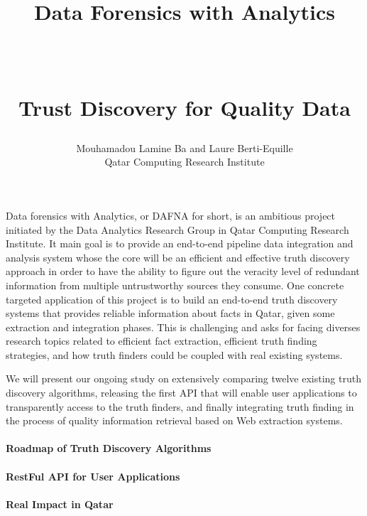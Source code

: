 \documentclass[paper=a4, fontsize=11pt]{scrartcl}	%
\title{ \vspace{-1in} 	\usefont{OT1}{bch}{b}{n}
		\huge \strut Data Forensics with Analytics\strut \\
		\Large \bfseries \strut Trust Discovery for Quality Data\strut
}
\author{ 									\usefont{OT1}{bch}{m}{n}
        Mouhamadou Lamine Ba and Laure Berti-Equille\\		\usefont{OT1}{bch}{m}{n}
        Qatar Computing Research Institute\\	\usefont{OT1}{bch}{m}{n}
}
\date{}
\numberwithin{equation}{section}															%
\numberwithin{figure}{section}																%
\numberwithin{table}{section}																%
\begin{document}
\maketitle
 
 Data forensics with Analytics, or DAFNA for short, is an ambitious project initiated by the Data Analytics Research Group in Qatar Computing Research
 Institute. It main goal is to provide an end-to-end pipeline data integration and analysis system whose the core will be an efficient 
 and effective truth discovery approach in order to have the ability to figure out the veracity level of redundant information from
 multiple untrustworthy sources they consume. One concrete targeted application
 of this project is to build an end-to-end truth discovery systems that provides reliable information about facts in Qatar, given 
 some extraction and integration phases. This is challenging and asks for facing diverses research topics related to efficient fact
 extraction, efficient truth finding strategies, and how truth finders could be coupled with real existing systems.

 
 
 We will present our ongoing study on extensively comparing twelve existing truth discovery algorithms, releasing the first API that will 
 enable user applications to transparently access to the truth finders, and finally integrating truth finding in the process of quality information 
 retrieval based on Web extraction systems.
 
 \paragraph*{Roadmap of Truth Discovery Algorithms}
 \paragraph*{RestFul API for User Applications}
 \paragraph*{Real Impact in Qatar}
\end{document}
